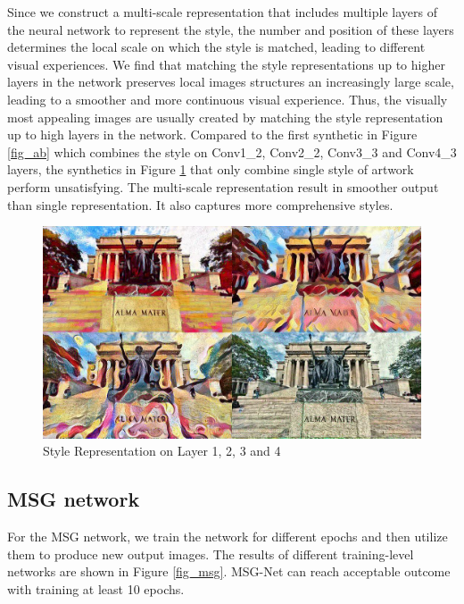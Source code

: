 \documentclass[10pt,twocolumn,letterpaper]{article}
\begin{document}
Since we construct a multi-scale representation that includes multiple layers of the neural network to represent the style, the number and position of these layers determines the local scale on which the style is matched, leading to different visual experiences. We find that matching the style representations up to higher layers in the network preserves local images structures an increasingly large scale, leading to a smoother and more continuous visual experience. Thus, the visually most appealing images are usually created by matching the style representation up to high layers in the network. Compared to the first synthetic in Figure \ref{fig_ab} which combines the style on Conv1\_2, Conv2\_2, Conv3\_3 and Conv4\_3 layers, the synthetics in Figure \ref{fig_layers} that only combine single style of artwork perform unsatisfying. The multi-scale representation result in smoother output than single representation. It also captures more comprehensive styles.

\begin{figure}[t]
\begin{center}
\includegraphics[width=0.9\linewidth]{images/merge_style.jpg}
\end{center}
\caption{Style Representation on Layer 1, 2, 3 and 4}
\label{fig:long}
\label{fig:onecol}
\label{fig_layers}
\end{figure}

\subsection{MSG network}

For the MSG network, we train the network for different epochs and then utilize them to produce new output images. The results of different training-level networks are shown in Figure \ref{fig_msg}. MSG-Net can reach acceptable outcome with training at least 10 epochs. 
\end{document}

